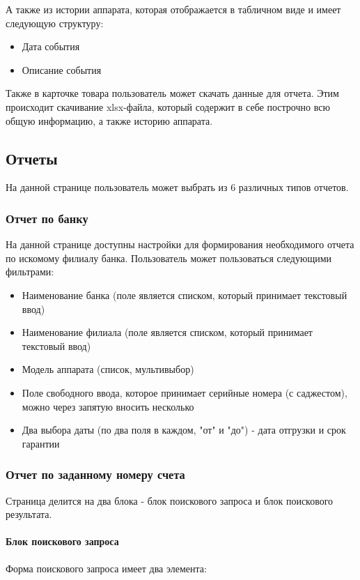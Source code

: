 \documentclass[DIV=calc, paper=a4, fontsize=11pt]{scrartcl} %
\begin{document}
А также из истории аппарата, которая отображается в табличном виде и имеет следующую структуру:

\begin{itemize}
	\item Дата события
	\item Описание события
\end{itemize}

Также в карточке товара пользователь может скачать данные для отчета. Этим происходит скачивание xlsx-файла, который содержит в себе построчно всю общую информацию, а также историю аппарата.


\subsection{Отчеты}
На данной странице пользователь может выбрать из 6 различных типов отчетов.

\subsubsection{Отчет по банку}
На данной странице доступны настройки для формирования необходимого отчета по искомому филиалу банка. Пользователь может пользоваться следующими фильтрами:

\begin{itemize}
	\item Наименование банка (поле является списком, который принимает текстовый ввод)
	\item Наименование филиала (поле является списком, который принимает текстовый ввод)
	\item Модель аппарата (список, мультивыбор)
	\item Поле свободного ввода, которое принимает серийные номера (с саджестом), можно через запятую вносить несколько
	\item Два выбора даты (по два поля в каждом, "от" и "до") - дата отгрузки и срок гарантии
\end{itemize}

\subsubsection{Отчет по заданному номеру счета}
Страница делится на два блока - блок поискового запроса и блок поискового результата.
\paragraph{Блок поискового запроса}
Форма поискового запроса имеет два элемента:
\end{document}
